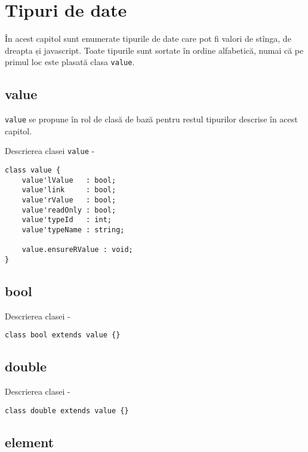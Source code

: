 \section{Tipuri de date}

În acest capitol sunt enumerate tipurile de date care pot fi valori de stînga, de dreapta și javascript. Toate tipurile sunt sortate în ordine alfabetică, numai că pe primul loc este plasată clasa \texttt{value}.

\subsection{{\color{lightblue} value}}

\texttt{value} se propune în rol de clasă de bază pentru restul tipurilor descrise în acest capitol.

\noindent Descrierea clasei \texttt{value} -
\begin{verbatim}
class value {
    value'lValue   : bool;
    value'link     : bool;
    value'rValue   : bool;
    value'readOnly : bool;
    value'typeId   : int;
    value'typeName : string;

    value.ensureRValue : void;
}
\end{verbatim}

\subsection{{\color{lightblue} bool}}

\noindent Descrierea clasei \bool -
\begin{verbatim}
class bool extends value {}
\end{verbatim}

\subsection{{\color{lightblue} double}}

\noindent Descrierea clasei \double -
\begin{verbatim}
class double extends value {}
\end{verbatim}

\subsection{{\color{lightblue} element}}

